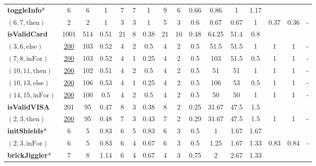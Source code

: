 \documentclass[sigconf,review]{acmart}
\newcommand{\thenBr}{\text{then}}
\newcommand{\elseBr}{\text{else}}
\newcommand{\inFor}{\text{inFor}}
\newcommand{\un}[1]{\underline{#1}}
\begin{document}
\begin{table}[!t]
\begin{tabular}{l|ccc|ccc|ccc|ccc|ccc}
    \hline
   \textbf{toggleInfo}*      & 6        & 6    & 1         & 7  & 7 & 1                 & 9 & 6   & 0.66               & 0.86  & 1     & 1.17  &    &      &       \\
    $(6,7,\thenBr)$          & 2        & 2    & 1         & 3  & 3 & 1                 & 5 & 3   & 0.6                & 0.67  & 0.67  & 1     & 0.37 & 0.36 & -  \\
    \hline
   \textbf{isValidCard}      & 1001     & 514  & 0.51      & 21 & 8 & 0.38              & 21 & 10 & 0.48               & 64.25 & 51.4  & 0.8    &   &   &       \\
    $(3,6,\elseBr)$          & \un{200} & 103  & 0.52      & 4  & 2 & 0.5               & 4  & 2  & 0.5                & 51.5  & 51.5  & 1      & 1 & 1 & -   \\
    $(7,8,\inFor)$           & \un{200} & 103  & 0.52      & 4  & 1 & 0.25              & 4  & 2  & 0.5                & 103   & 51.5  & 0.5    & 1 & 1 & -  \\
    $(10,11,\thenBr)$        & \un{200} & 102  & 0.51      & 4  & 2 & 0.5               & 4  & 2  & 0.5                & 51    & 51    & 1      & 1 & 1 & -  \\
    $(10,13,\elseBr)$        & \un{200} & 106  & 0.53      & 4  & 1 & 0.25              & 4  & 2  & 0.5                & 106   & 53    & 0.5    & 1 & 1 & -  \\
    $(14,15,\inFor)$         & \un{200} & 100  & 0.5       & 4  & 2 & 0.5               & 4  & 2  & 0.5                & 50    & 50    & 1      & 1 & 1 & -  \\
    \hline
   \textbf{isValidVISA}      & 201      & 95   & 0.47      & 8  & 3 & 0.38              & 8  & 2  & 0.25               & 31.67 & 47.5  & 1.5    &   &   &       \\
    $(2,3,\thenBr)$          & \un{200} & 95   & 0.48      & 7  & 3 & 0.43              & 7  & 2  & 0.29               & 31.67 & 47.5  & 1.5    & 1 & 1 & -  \\
    \hline
   \textbf{initShields}*     & 6        & 5    & 0.83      & 6  & 5 & 0.83              & 6  & 3  & 0.5                & 1      & 1.67 & 1.67   &      &      &       \\
    $(2,3,\inFor)$           & 6        & 5    & 0.83      & 6  & 4 & 0.67              & 6  & 3  & 0.5                & 1.25   & 1.67 & 1.33   & 0.83 & 0.84 & -  \\
    \hline
   \textbf{brickJiggler}*    & 7        & 8    & 1.14      & 6  & 4 & 0.67              & 4  & 3  & 0.75               & 2      & 2.67 & 1.33   &      &      &       \\

\end{tabular}
\end{table}
\end{document}
